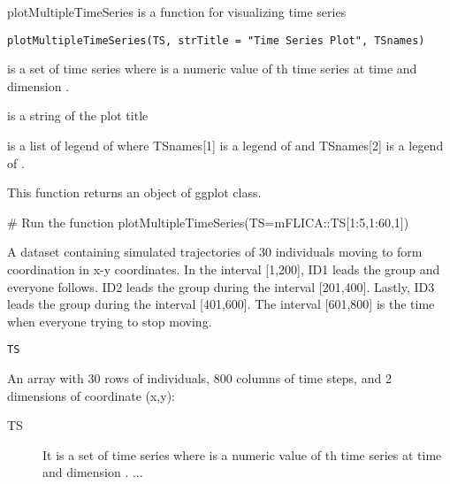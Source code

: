 \documentclass[a4paper]{book}
\begin{document}
%
\begin{Description}\relax
plotMultipleTimeSeries is a function for visualizing time series
\end{Description}
%
\begin{Usage}
\begin{verbatim}
plotMultipleTimeSeries(TS, strTitle = "Time Series Plot", TSnames)
\end{verbatim}
\end{Usage}
%
\begin{Arguments}
\begin{ldescription}
\item[\code{TS}] is a set of time series where  is a numeric value of th time series at time  and dimension .

\item[\code{strTitle}] is a string of the plot title

\item[\code{TSnames}] is a list of legend of  where TSnames[1] is a legend of  and  TSnames[2] is a legend of .
\end{ldescription}
\end{Arguments}
%
\begin{Value}
This function returns an object of ggplot class.
\end{Value}
%
\begin{Examples}
\begin{ExampleCode}
# Run the function
plotMultipleTimeSeries(TS=mFLICA::TS[1:5,1:60,1])

\end{ExampleCode}
\end{Examples}
%
\begin{Description}\relax
A dataset containing simulated trajectories of 30 individuals moving to form coordination in x-y coordinates.
In the interval [1,200], ID1 leads the group and everyone follows. ID2 leads the group during the interval [201,400].
Lastly, ID3 leads the group during the interval [401,600]. The interval [601,800] is the time when everyone trying to stop moving.
\end{Description}
%
\begin{Usage}
\begin{verbatim}
TS
\end{verbatim}
\end{Usage}
%
\begin{Format}
An array with 30 rows of individuals, 800 columns of time steps, and 2 dimensions of coordinate (x,y):
\begin{description}

\item[TS]  It is a set of time series where  is a numeric value of th time series at time  and dimension .
...

\end{description}
\end{Format}
\printindex{}
\end{document}

